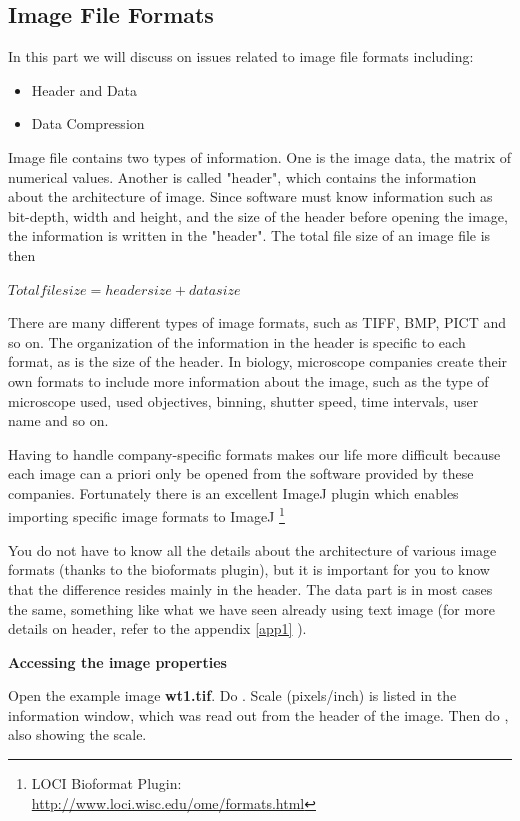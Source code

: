 \subsection{Image File Formats}

In this part we will discuss on issues related to image file formats including:

\begin{itemize}
    \item Header and Data
    \item Data Compression
\end{itemize}

Image file contains two types of information. 
One is the image data, the matrix of numerical values. 
Another is called "header", which contains the information about the architecture of image. 
Since software must know information such as bit-depth, width and height, and the size of 
the header before opening the image, the information is written in the "header". 
The total file size of an image file is then 

$Total file size = header size + data size$

There are many different types of image formats, such as TIFF, BMP, PICT and so
on. The organization of the information in the header is specific to each format, as is the size of the header. In biology, microscope companies create their own formats to
include more information about the image, such as the type of microscope used,
used objectives, binning, shutter speed, time intervals, user name and so on.

Having to handle company-specific formats makes our life more difficult because each image can a priori
only be opened from the software provided by these companies. Fortunately there
is an excellent ImageJ plugin which enables importing specific image formats to ImageJ
\footnote{\tab LOCI Bioformat Plugin:\\
\url{http://www.loci.wisc.edu/ome/formats.html}}

You do not have to know all the details about the architecture of various image
formats (thanks to the bioformats plugin), but it is important for you to know
that the difference resides mainly in the header. The data part is in most cases
the same, something like what we have seen already using text image (for more
details on header, refer to the appendix \ref{app1} ).

\begin{indentexercise}{1}

\textbf{Accessing the image properties}

Open the example image \textbf{wt1.tif}. Do
. Scale (pixels/inch)
is listed in the information window, which was read out from the header
of the image. Then do ,
also showing the scale. 
\end{indentexercise}

